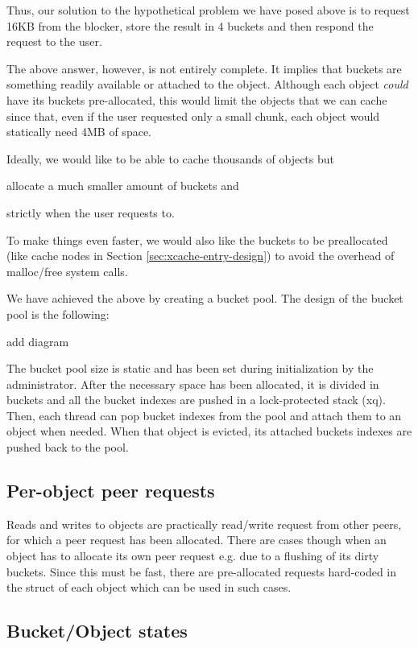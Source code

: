 Thus, our solution to the hypothetical problem we have posed above is to 
request 16KB from the blocker, store the result in 4 buckets and then respond 
the request to the user.

The above answer, however, is not entirely complete. It implies that buckets 
are something readily available or attached to the object. Although each object 
\textit{could} have its buckets pre-allocated, this would limit the objects 
that we can cache since that, even if the user requested only a small chunk, 
each object would statically need 4MB of space.

Ideally, we would like to be able to cache thousands of objects but
\begin{inparaenum}[i)]
\item allocate a much smaller amount of buckets and
\item strictly when the user requests to.
\end{inparaenum}
To make things even faster, we would also like the buckets to be preallocated 
(like cache nodes in Section \ref{sec:xcache-entry-design}) to avoid the 
overhead of malloc/free system calls.

We have achieved the above by creating a bucket pool. The design of the bucket 
pool is the following:

\fixme add diagram

The bucket pool size is static and has been set during initialization by the 
administrator. After the necessary space has been allocated, it is divided in 
buckets and all the bucket indexes are pushed in a lock-protected stack (xq).  
Then, each thread can pop bucket indexes from the pool and attach them
to an object when needed. When that object is evicted, its attached buckets 
indexes are pushed back to the pool.

\subsection{Per-object peer requests}

Reads and writes to objects are practically read/write request from other
peers, for which a peer request has been allocated. There are cases though
when an object has to allocate its own peer request e.g. due to a flushing of
its dirty buckets. Since this must be fast, there are pre-allocated requests
hard-coded in the struct of each object which can be used in such cases.

\subsection{Bucket/Object states}


